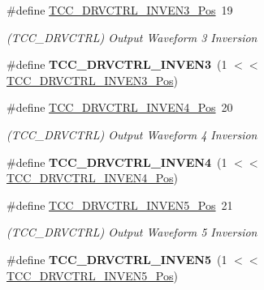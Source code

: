 \begin{DoxyCompactItemize}
\item 
\hypertarget{group___s_a_m_l21___t_c_c_gadab5541eccecb1b715687c3f4188d8bb}{}\#define \hyperlink{group___s_a_m_l21___t_c_c_gadab5541eccecb1b715687c3f4188d8bb}{T\+C\+C\+\_\+\+D\+R\+V\+C\+T\+R\+L\+\_\+\+I\+N\+V\+E\+N3\+\_\+\+Pos}~19\label{group___s_a_m_l21___t_c_c_gadab5541eccecb1b715687c3f4188d8bb}

\begin{DoxyCompactList}\small\item\em (T\+C\+C\+\_\+\+D\+R\+V\+C\+T\+R\+L) Output Waveform 3 Inversion \end{DoxyCompactList}\item 
\hypertarget{group___s_a_m_l21___t_c_c_ga418dffcc24d7218129e0771a1021da45}{}\#define {\bfseries T\+C\+C\+\_\+\+D\+R\+V\+C\+T\+R\+L\+\_\+\+I\+N\+V\+E\+N3}~(1 $<$$<$ \hyperlink{group___s_a_m_l21___t_c_c_gadab5541eccecb1b715687c3f4188d8bb}{T\+C\+C\+\_\+\+D\+R\+V\+C\+T\+R\+L\+\_\+\+I\+N\+V\+E\+N3\+\_\+\+Pos})\label{group___s_a_m_l21___t_c_c_ga418dffcc24d7218129e0771a1021da45}

\item 
\hypertarget{group___s_a_m_l21___t_c_c_ga91bb95616c9eba19aeea40d623a249aa}{}\#define \hyperlink{group___s_a_m_l21___t_c_c_ga91bb95616c9eba19aeea40d623a249aa}{T\+C\+C\+\_\+\+D\+R\+V\+C\+T\+R\+L\+\_\+\+I\+N\+V\+E\+N4\+\_\+\+Pos}~20\label{group___s_a_m_l21___t_c_c_ga91bb95616c9eba19aeea40d623a249aa}

\begin{DoxyCompactList}\small\item\em (T\+C\+C\+\_\+\+D\+R\+V\+C\+T\+R\+L) Output Waveform 4 Inversion \end{DoxyCompactList}\item 
\hypertarget{group___s_a_m_l21___t_c_c_ga5911300e0ca2dd5307630a067e1234f6}{}\#define {\bfseries T\+C\+C\+\_\+\+D\+R\+V\+C\+T\+R\+L\+\_\+\+I\+N\+V\+E\+N4}~(1 $<$$<$ \hyperlink{group___s_a_m_l21___t_c_c_ga91bb95616c9eba19aeea40d623a249aa}{T\+C\+C\+\_\+\+D\+R\+V\+C\+T\+R\+L\+\_\+\+I\+N\+V\+E\+N4\+\_\+\+Pos})\label{group___s_a_m_l21___t_c_c_ga5911300e0ca2dd5307630a067e1234f6}

\item 
\hypertarget{group___s_a_m_l21___t_c_c_gaeee3e1422c6bd0afb47d1a7e867c1a6a}{}\#define \hyperlink{group___s_a_m_l21___t_c_c_gaeee3e1422c6bd0afb47d1a7e867c1a6a}{T\+C\+C\+\_\+\+D\+R\+V\+C\+T\+R\+L\+\_\+\+I\+N\+V\+E\+N5\+\_\+\+Pos}~21\label{group___s_a_m_l21___t_c_c_gaeee3e1422c6bd0afb47d1a7e867c1a6a}

\begin{DoxyCompactList}\small\item\em (T\+C\+C\+\_\+\+D\+R\+V\+C\+T\+R\+L) Output Waveform 5 Inversion \end{DoxyCompactList}\item 
\hypertarget{group___s_a_m_l21___t_c_c_ga31d12af246d8f1d8809d04120c69c114}{}\#define {\bfseries T\+C\+C\+\_\+\+D\+R\+V\+C\+T\+R\+L\+\_\+\+I\+N\+V\+E\+N5}~(1 $<$$<$ \hyperlink{group___s_a_m_l21___t_c_c_gaeee3e1422c6bd0afb47d1a7e867c1a6a}{T\+C\+C\+\_\+\+D\+R\+V\+C\+T\+R\+L\+\_\+\+I\+N\+V\+E\+N5\+\_\+\+Pos})\label{group___s_a_m_l21___t_c_c_ga31d12af246d8f1d8809d04120c69c114}


\end{DoxyCompactItemize}
